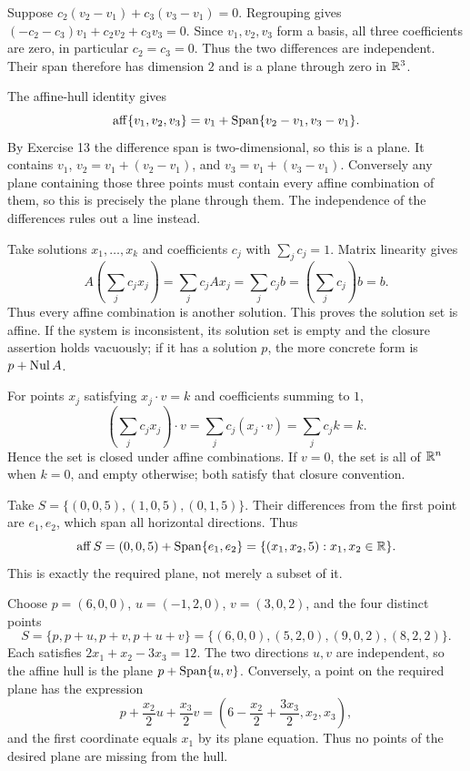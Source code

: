 Suppose $c_2(v_2-v_1)+c_3(v_3-v_1)=0$. Regrouping gives $(-c_2-c_3)v_1+c_2v_2+c_3v_3=0$. Since $v_1,v_2,v_3$ form a basis, all three coefficients are zero, in particular $c_2=c_3=0$. Thus the two differences are independent. Their span therefore has dimension $2$ and is a plane through zero in $\mathbb{R}^3$.

The affine-hull identity gives
\[
\operatorname{aff}\{v_1,v_2,v_3\}
=v_1+\operatorname{Span}\{v_2-v_1,v_3-v_1\}.
\]
By Exercise 13 the difference span is two-dimensional, so this is a plane. It contains $v_1$, $v_2=v_1+(v_2-v_1)$, and $v_3=v_1+(v_3-v_1)$. Conversely any plane containing those three points must contain every affine combination of them, so this is precisely the plane through them. The independence of the differences rules out a line instead.

Take solutions $x_1,\ldots,x_k$ and coefficients $c_j$ with $\sum_jc_j=1$. Matrix linearity gives
\[
A\left(\sum_jc_jx_j\right)=\sum_jc_jAx_j
=\sum_jc_jb=\left(\sum_jc_j\right)b=b.
\]
Thus every affine combination is another solution. This proves the solution set is affine. If the system is inconsistent, its solution set is empty and the closure assertion holds vacuously; if it has a solution $p$, the more concrete form is $p+\operatorname{Nul} A$.

For points $x_j$ satisfying $x_j\cdot v=k$ and coefficients summing to $1$,
\[
\left(\sum_jc_jx_j\right)\cdot v
=\sum_jc_j(x_j\cdot v)=\sum_jc_jk=k.
\]
Hence the set is closed under affine combinations. If $v=0$, the set is all of $\mathbb{R}^n$ when $k=0$, and empty otherwise; both satisfy that closure convention.

Take $S=\{(0,0,5),(1,0,5),(0,1,5)\}$. Their differences from the first point are $e_1,e_2$, which span all horizontal directions. Thus
\[
\operatorname{aff}S=(0,0,5)+\operatorname{Span}\{e_1,e_2\}
=\{(x_1,x_2,5):x_1,x_2\in\mathbb{R}\}.
\]
This is exactly the required plane, not merely a subset of it.

Choose $p=(6,0,0)$, $u=(-1,2,0)$, $v=(3,0,2)$, and the four distinct points
\[
S=\{p,p+u,p+v,p+u+v\}
=\{(6,0,0),(5,2,0),(9,0,2),(8,2,2)\}.
\]
Each satisfies $2x_1+x_2-3x_3=12$. The two directions $u,v$ are independent, so the affine hull is the plane $p+\operatorname{Span}\{u,v\}$. Conversely, a point on the required plane has the expression
\[
p+\frac{x_2}{2}u+\frac{x_3}{2}v
=\left(6-\frac{x_2}{2}+\frac{3x_3}{2},x_2,x_3\right),
\]
and the first coordinate equals $x_1$ by its plane equation. Thus no points of the desired plane are missing from the hull.

